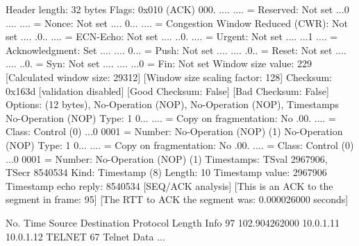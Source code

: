     Header length: 32 bytes
    Flags: 0x010 (ACK)
        000. .... .... = Reserved: Not set
        ...0 .... .... = Nonce: Not set
        .... 0... .... = Congestion Window Reduced (CWR): Not set
        .... .0.. .... = ECN-Echo: Not set
        .... ..0. .... = Urgent: Not set
        .... ...1 .... = Acknowledgment: Set
        .... .... 0... = Push: Not set
        .... .... .0.. = Reset: Not set
        .... .... ..0. = Syn: Not set
        .... .... ...0 = Fin: Not set
    Window size value: 229
    [Calculated window size: 29312]
    [Window size scaling factor: 128]
    Checksum: 0x163d [validation disabled]
        [Good Checksum: False]
        [Bad Checksum: False]
    Options: (12 bytes), No-Operation (NOP), No-Operation (NOP), Timestamps
        No-Operation (NOP)
            Type: 1
                0... .... = Copy on fragmentation: No
                .00. .... = Class: Control (0)
                ...0 0001 = Number: No-Operation (NOP) (1)
        No-Operation (NOP)
            Type: 1
                0... .... = Copy on fragmentation: No
                .00. .... = Class: Control (0)
                ...0 0001 = Number: No-Operation (NOP) (1)
        Timestamps: TSval 2967906, TSecr 8540534
            Kind: Timestamp (8)
            Length: 10
            Timestamp value: 2967906
            Timestamp echo reply: 8540534
    [SEQ/ACK analysis]
        [This is an ACK to the segment in frame: 95]
        [The RTT to ACK the segment was: 0.000026000 seconds]

No.     Time           Source                Destination           Protocol Length Info
     97 102.904262000  10.0.1.11             10.0.1.12             TELNET   67     Telnet Data ...

